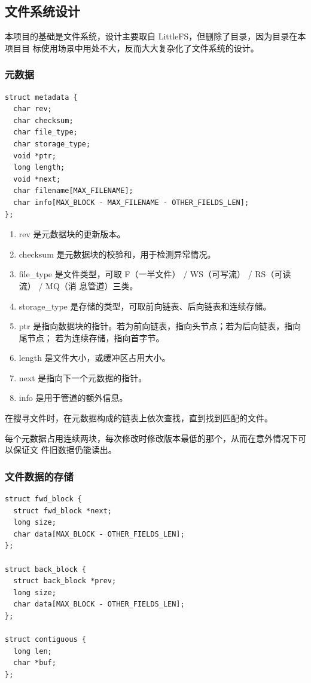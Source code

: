 \documentclass{ctexart}
\begin{document}
\subsection{文件系统设计}
\label{design-fs}
本项目的基础是文件系统，设计主要取自 LittleFS，但删除了目录，因为目录在本项目目
标使用场景中用处不大，反而大大复杂化了文件系统的设计。

\subsubsection{元数据}
\begin{verbatim}
struct metadata {
  char rev;
  char checksum;
  char file_type;
  char storage_type;
  void *ptr;
  long length;
  void *next;
  char filename[MAX_FILENAME];
  char info[MAX_BLOCK - MAX_FILENAME - OTHER_FIELDS_LEN];
};
\end{verbatim}

\begin{enumerate}
\item rev 是元数据块的更新版本。
\item checksum 是元数据块的校验和，用于检测异常情况。
\item file\_type 是文件类型，可取 F（一半文件） / WS（可写流） / RS（可读流） / MQ（消
  息管道）三类。
\item storage\_type 是存储的类型，可取前向链表、后向链表和连续存储。
\item ptr 是指向数据块的指针。若为前向链表，指向头节点；若为后向链表，指向尾节点；
  若为连续存储，指向首字节。
\item length 是文件大小，或缓冲区占用大小。
\item next 是指向下一个元数据的指针。
\item info 是用于管道的额外信息。
\end{enumerate}

在搜寻文件时，在元数据构成的链表上依次查找，直到找到匹配的文件。

每个元数据占用连续两块，每次修改时修改版本最低的那个，从而在意外情况下可以保证文
件旧数据仍能读出。

\subsubsection{文件数据的存储}

\begin{verbatim}
struct fwd_block {
  struct fwd_block *next;
  long size;
  char data[MAX_BLOCK - OTHER_FIELDS_LEN];
};

struct back_block {
  struct back_block *prev;
  long size;
  char data[MAX_BLOCK - OTHER_FIELDS_LEN];
};

struct contiguous {
  long len;
  char *buf;
};
\end{verbatim}
\end{document}
